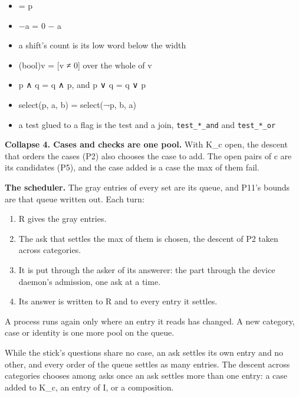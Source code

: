 \begin{itemize}
\item [select(p, 1, 0) ≠ 0] = p
\item −a = 0 − a
\item a shift's count is its low word below the width
\item (bool)v = [v ≠ 0] over the whole of v
\item p ∧ q = q ∧ p, and p ∨ q = q ∨ p
\item select(p, a, b) = select(¬p, b, a)
\item a test glued to a flag is the test and a join, \texttt{test\_\allowbreak{}*\_\allowbreak{}and} and \texttt{test\_\allowbreak{}*\_\allowbreak{}or}
\end{itemize}

\textbf{Collapse 4. Cases and checks are one pool.} With K\_\allowbreak{}c open, the descent that orders the cases (P2) also chooses the case to add. The open pairs of c are its candidates (P5), and the case added is a case the max of them fail.

\textbf{The scheduler.} The gray entries of every set are its queue, and P11's bounds are that queue written out. Each turn:

\begin{enumerate}
\item R gives the gray entries.
\item The ask that settles the max of them is chosen, the descent of P2 taken across categories.
\item It is put through the asker of its answerer: the part through the device daemon's admission, one ask at a time.
\item Its answer is written to R and to every entry it settles.
\end{enumerate}

A process runs again only where an entry it reads has changed. A new category, case or identity is one more pool on the queue.

While the stick's questions share no case, an ask settles its own entry and no other, and every order of the queue settles as many entries. The descent across categories chooses among asks once an ask settles more than one entry: a case added to K\_\allowbreak{}c, an entry of I, or a composition.

